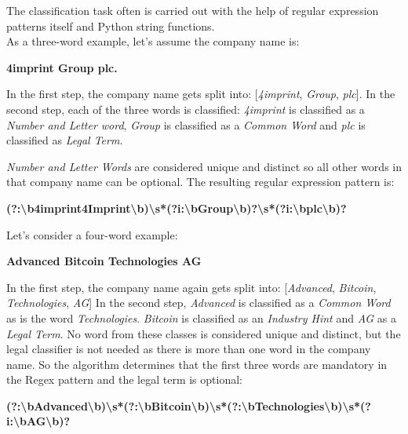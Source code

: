 The classification task often is carried out with the help of regular expression patterns itself and Python string functions.\\

As a three-word example, let’s assume the company name is:

\begin{center}
\textbf{4imprint Group plc.}
\end{center}

In the first step, the company name gets split into: [\emph{4imprint}, \emph{Group}, \emph{plc}].
In the second step, each of the three words is classified: \emph{4imprint} is classified as a \emph{Number and Letter word}, \emph{Group} is classified as a \emph{Common Word} and \emph{plc} is classified as \emph{Legal Term}.

\emph{Number and Letter Words} are considered unique and distinct so all other words in that company name can be optional.
The resulting regular expression pattern is:

\begin{center}
\footnotesize{\textbf{(?:\textbackslash b4imprint\textbar4Imprint\textbackslash b)\textbackslash s*(?i:\textbackslash bGroup\textbackslash b)?\textbackslash s*(?i:\textbackslash bplc\textbackslash b)?}}
\end{center}

Let’s consider a four-word example:

\begin{center}
\textbf{Advanced Bitcoin Technologies AG}
\end{center}

In the first step, the company name again gets split into: [\emph{Advanced}, \emph{Bitcoin}, \emph{Technologies}, \emph{AG}]
In the second step, \emph{Advanced} is classified as a \emph{Common Word} as is the word \emph{Technologies}.
\emph{Bitcoin} is classified as an \emph{Industry Hint} and \emph{AG} as a \emph{Legal Term}.
No word from these classes is considered unique and distinct, but the legal classifier is not needed as there is more than one word in the company name.
So the algorithm determines that the first three words are mandatory in the \gls{Regex} pattern and the legal term is optional:

\begin{center}                                                                                                                                                                                                              
\footnotesize{\textbf{(?:\textbackslash bAdvanced\textbackslash b)\textbackslash s*(?:\textbackslash bBitcoin\textbackslash b)\textbackslash s*(?:\textbackslash bTechnologies\textbackslash b)\textbackslash s*(?i:\textbackslash bAG\textbackslash b)?}}
\end{center}


